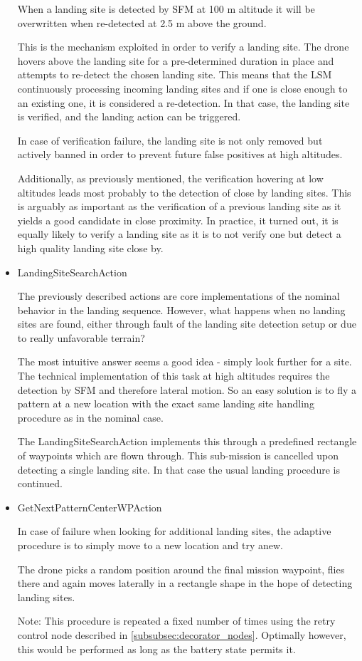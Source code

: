 \begin{itemize}
    When a landing site is detected by SFM at 100 m altitude it will be overwritten when re-detected at 2.5 m above the ground. 

    This is the mechanism exploited in order to verify a landing site. The drone hovers above the landing site for a pre-determined duration in place and attempts to re-detect the chosen landing site. This means that the LSM continuously processing incoming landing sites and if one is close enough to an existing one, it is considered a re-detection. In that case, the landing site is verified, and the landing action can be triggered.

    In case of verification failure, the landing site is not only removed but actively banned in order to prevent future false positives at high altitudes.

    Additionally, as previously mentioned, the verification hovering at low altitudes leads most probably to the detection of close by landing sites. This is arguably as important as the verification of a previous landing site as it yields a good candidate in close proximity. In practice, it turned out,  it is equally likely to verify a landing site as it is to not verify one but detect a high quality landing site close by.
    \item LandingSiteSearchAction

    The previously described actions are core implementations of the nominal behavior in the landing sequence. However, what happens when no landing sites are found, either through fault of the landing site detection setup or due to really unfavorable terrain?

    The most intuitive answer seems a good idea - simply look further for a site. The technical implementation of this task at high altitudes requires the detection by SFM and therefore lateral motion. So an easy solution is to fly a pattern at a new location with the exact same landing site handling procedure as in the nominal case.

    The LandingSiteSearchAction implements this through a predefined rectangle of waypoints which are flown through. This sub-mission is cancelled upon detecting a single landing site. In that case the usual landing procedure is continued.
    \item GetNextPatternCenterWPAction

    In case of failure when looking for additional landing sites, the adaptive procedure is to simply move to a new location and try anew. 

    The drone picks a random position around the final mission waypoint, flies there and again moves laterally in a rectangle shape in the hope of detecting landing sites.

    Note: This procedure is repeated a fixed number of times using the retry control node described in \cref{subsubsec:decorator_nodes}. Optimally however, this would be performed as long as the battery state permits it. 
    \end{itemize}

